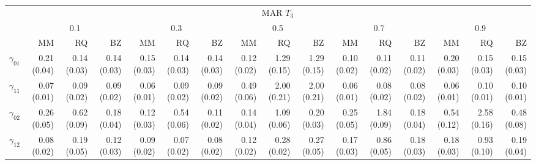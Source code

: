 \documentclass[12pt]{article}
\begin{document}
\begin{landscape}
\begin{table}[ht]
  \begin{tabular}{rrrrrrrrrrrrrrrr}
    \toprule
    & \multicolumn{ 15}{c}{MAR $T_3$} \\
    \cline{2-16}
    &  \multicolumn{3}{c}{0.1} &  \multicolumn{3}{c}{0.3} &  \multicolumn{3}{c}{0.5} &
    \multicolumn{3}{c}{0.7} &  \multicolumn{3}{c}{0.9} \\
    \cline{2-16}
    & MM   & RQ   & BZ   & MM   & RQ   & BZ   & MM   & RQ   & BZ   & MM   & RQ   & BZ   & MM   & RQ   & BZ   \\
    \hline
    $\gamma_{01}$  & 0.21 (0.04) & 0.14 (0.03) & 0.14 (0.03) & 0.15 (0.03) & 0.14 (0.03) & 0.14 (0.03) & 0.12 (0.02) & 1.29 (0.15) & 1.29 (0.15) & 0.10 (0.02) & 0.11 (0.02) & 0.11 (0.02) & 0.20 (0.03) & 0.15 (0.03) & 0.15 (0.03) \\
    $\gamma_{11}$  & 0.07 (0.01) & 0.09 (0.02) & 0.09 (0.02) & 0.06 (0.01) & 0.09 (0.02) & 0.09 (0.02) & 0.49 (0.06) & 2.00 (0.21) & 2.00 (0.21) & 0.06 (0.01) & 0.08 (0.02) & 0.08 (0.02) & 0.06 (0.01) & 0.10 (0.01) & 0.10 (0.01) \\
    $\gamma_{02}$  & 0.26 (0.05) & 0.62 (0.09) & 0.18 (0.04) & 0.12 (0.03) & 0.54 (0.06) & 0.11 (0.02) & 0.14 (0.04) & 1.09 (0.06) & 0.20 (0.03) & 0.25 (0.05) & 1.84 (0.09) & 0.18 (0.04) & 0.54 (0.12) & 2.58 (0.16) & 0.48 (0.08) \\
    $\gamma_{12}$  & 0.08 (0.02) & 0.19 (0.05) & 0.12 (0.03) & 0.09 (0.02) & 0.07 (0.02) & 0.08 (0.02) & 0.12 (0.02) & 0.28 (0.02) & 0.27 (0.05) & 0.17 (0.03) & 0.86 (0.05) & 0.18 (0.03) & 0.18 (0.03) & 0.93 (0.10) & 0.19 (0.04) \\
    \bottomrule
  \end{tabular}


\end{table}
\end{landscape}
\end{document}
